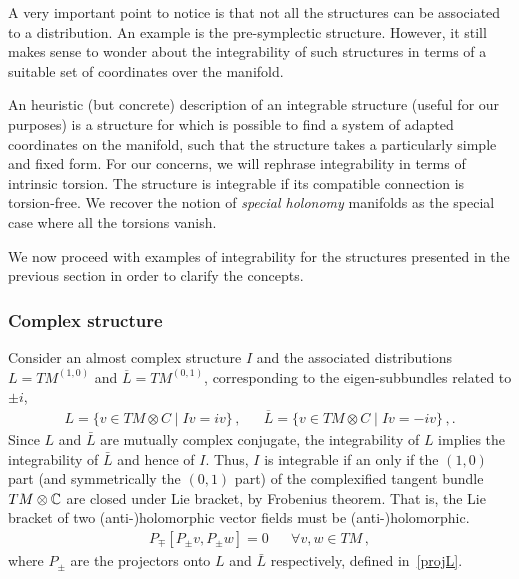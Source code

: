 \documentclass[debug]{phd}
\begin{document}
					A very important point to notice is that not all the structures can be associated to a distribution.
					An example is the pre-symplectic structure.
					However, it still makes sense to wonder about the integrability of such structures in terms of a suitable set of coordinates over the manifold.
						
					An heuristic (but concrete) description of an integrable structure (useful for our purposes) is a structure for which is possible to find a system of adapted coordinates on the manifold, such that the structure takes a particularly simple and fixed form.
					For our concerns, we will rephrase integrability in terms of intrinsic torsion.
					The structure is integrable if its compatible connection is torsion-free.
					We recover the notion of \emph{special holonomy} manifolds as the special case where all the torsions vanish.
					
					We now proceed with examples of integrability for the structures presented in the previous section in order to clarify the concepts.
				\subsubsection{Complex structure}
						Consider an almost complex structure $I$ and the associated distributions $L = TM^{(1,0)}$ and $\overline{L} = TM^{(0,1)}$, corresponding to the eigen-subbundles related to $\pm i$,
								\begin{align*}
									& &	L = \{ v \in TM \otimes C \mid I v = i v \} \, ,	& &	\overline{L} = \{ v \in TM \otimes C \mid I v = -i v \} \, ,.& & 
								\end{align*}
						Since $L$ and $\bar{L}$ are mutually complex conjugate, the integrability of $L$ implies the integrability of $\bar{L}$ and hence of $I$.
						Thus, $I$ is integrable if an only if the $(1,0)$ part (and symmetrically the $(0,1)$ part) of the complexified tangent bundle $TM\otimes \mathbb{C}$ are closed under Lie bracket, by Frobenius theorem.
						That is, the Lie bracket of two (anti-)holomorphic vector fields must be (anti-)holomorphic.
								\begin{align}\label{FrobCompl}
									& &	P_{\mp} \left[ P_{\pm} v, P_{\pm} w \right] = 0	& &	\forall v,w \in TM \, ,	& &
								\end{align}
						where $P_{\pm}$ are the projectors onto $L$ and $\bar{L}$ respectively, defined in~\eqref{projL}.
						
\end{document}

